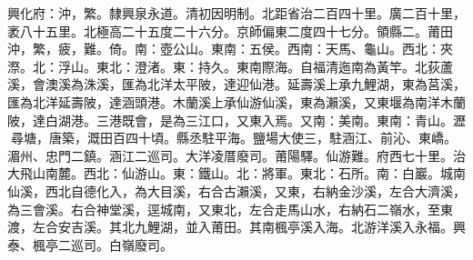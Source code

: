 \begin{pinyinscope}
興化府：沖，繁。隸興泉永道。清初因明制。北距省治二百四十里。廣二百十里，袤八十五里。北極高二十五度二十六分。京師偏東二度四十七分。領縣二。莆田沖，繁，疲，難。倚。南：壺公山。東南：五侯。西南：天馬、龜山。西北：夾漈。北：浮山。東北：澄渚。東：持久。東南際海。自福清迤南為黃竿。北荻蘆溪，會澳溪為洙溪，匯為北洋太平陂，達迎仙港。延壽溪上承九鯉湖，東為莒溪，匯為北洋延壽陂，達涵頭港。木蘭溪上承仙游仙溪，東為瀨溪，又東堰為南洋木蘭陂，達白湖港。三港既會，是為三江口，又東入焉。又南：美南。東南：青山。瀝尋塘，唐築，溉田百四十頃。縣丞駐平海。鹽場大使三，駐涵江、前沁、東嶠。湄州、忠門二鎮。涵江二巡司。大洋凌厝廢司。莆陽驛。仙游難。府西七十里。治大飛山南麓。西北：仙游山。東：鐵山。北：將軍。東北：石所。南：白巖。城南仙溪，西北自德化入，為大目溪，右合古瀨溪，又東，右納金沙溪，左合大濟溪，為三會溪。右合神堂溪，逕城南，又東北，左合走馬山水，右納石二嶺水，至東渡，左合安吉溪。其北九鯉湖，並入莆田。其南楓亭溪入海。北游洋溪入永福。興泰、楓亭二巡司。白嶺廢司。


\end{pinyinscope}
